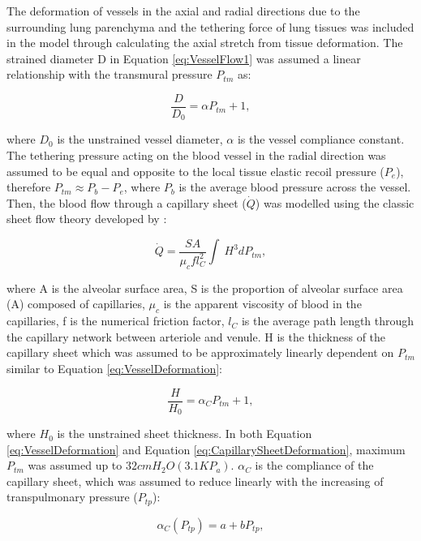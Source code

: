 The deformation of vessels in the axial and radial directions due to the surrounding lung parenchyma and the tethering force of lung tissues was included in the model through calculating the axial stretch from tissue deformation. The strained diameter D in Equation \ref{eq:VesselFlow1} was assumed a linear relationship with the transmural pressure $P_{tm}$ as:

\begin{equation}
 \label{eq:VesselDeformation}
 \frac{D}{D_0} = \alpha P_{tm} + 1,
\end{equation}

\noindent where $D_0$ is the unstrained vessel diameter, $\alpha$ is the vessel compliance constant. The tethering pressure acting on the blood vessel in the radial direction was assumed to be equal and opposite to the local tissue elastic recoil pressure ($P_e$), therefore $P_{tm} \approx P_b - P_e$, where $P_b$ is the average blood pressure across the vessel. Then, the blood flow through a capillary sheet ($\dot{Q}$) was modelled using the classic sheet flow theory developed by \cite{fung1969theory}:

\begin{equation}
 \label{eq:CapillarySheetFlow}
 \dot{Q} = \frac{SA}{\mu_c f l^{2}_{C}} \int\ H^{3}dP_{tm},
\end{equation}

\noindent where A is the alveolar surface area, S is the proportion of alveolar surface area (A) composed of capillaries, $\mu_c$ is the apparent viscosity of blood in the capillaries, f is the numerical friction factor, $l_C$ is the average path length through the capillary network between arteriole and venule. H is the thickness of the capillary sheet which was assumed to be approximately linearly dependent on $P_{tm}$ similar to Equation \ref{eq:VesselDeformation}:

\begin{equation}
 \label{eq:CapillarySheetDeformation}
 \frac{H}{H_0} = \alpha_C P_{tm} + 1,
\end{equation}

\noindent where $H_0$ is the unstrained sheet thickness. In both Equation \ref{eq:VesselDeformation} and Equation \ref{eq:CapillarySheetDeformation}, maximum $P_{tm}$ was assumed up to $32cmH_2 O(3.1KP_a)$. $\alpha_C$ is the compliance of the capillary sheet, which was assumed to reduce linearly with the increasing of transpulmonary pressure ($P_{tp}$):

\begin{equation} 
 \label{eq:CapillaryCompliance}
 \alpha_C(P_{tp}) = a + bP_{tp},
\end{equation}

